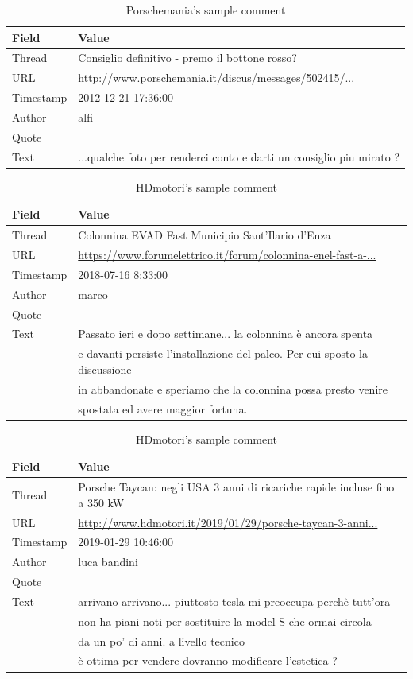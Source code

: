 \begin{table}[ht]
	\centering
	\begin{tabular}{l | l}
		Field & Value \\
		\hline 
		Thread & Consiglio definitivo - premo il bottone rosso? \\
		URL & \url{http://www.porschemania.it/discus/messages/502415/...}\\
		Timestamp & 2012-12-21 17:36:00\\
		Author & alfi\\
		Quote & \\
		Text & ...qualche foto per renderci conto e darti un consiglio piu mirato ?  
	\end{tabular}
	\caption{Porschemania's sample comment}
	\label{tab:porschemania-comment}
\end{table}

\begin{table}[ht]
	\centering
	\begin{tabular}{l | l}
		Field & Value \\
		\hline 
		Thread & Colonnina EVAD Fast Municipio Sant'Ilario d'Enza \\
		URL & \url{https://www.forumelettrico.it/forum/colonnina-enel-fast-a-...}\\
		Timestamp & 2018-07-16 8:33:00\\
		Author & marco\\
		Quote & \\
		Text & Passato ieri e dopo settimane... la colonnina è ancora spenta \\&e davanti persiste l'installazione del palco. Per cui sposto la discussione\\& in abbandonate e speriamo che la colonnina possa presto venire\\& spostata ed avere maggior fortuna.
	\end{tabular}
	\caption{HDmotori's sample comment}
	\label{tab:forumelettrico-comment}
\end{table}

\begin{table}[ht]
	\centering
	\begin{tabular}{l | l}
		Field & Value \\
		\hline 
		Thread & Porsche Taycan: negli USA 3 anni di ricariche rapide incluse fino a 350 kW\\
		URL & \url{http://www.hdmotori.it/2019/01/29/porsche-taycan-3-anni...}\\
		Timestamp & 2019-01-29 10:46:00\\
		Author & luca bandini\\
		Quote & \\
		Text & arrivano arrivano... piuttosto tesla mi preoccupa perchè tutt'ora\\& non ha piani noti per sostituire la model S che ormai circola\\& da un po' di anni. a livello tecnico \\&è ottima per vendere dovranno modificare l'estetica ?  
	\end{tabular}
	\caption{HDmotori's sample comment}
	\label{tab:hdmotori-comment}
\end{table}


